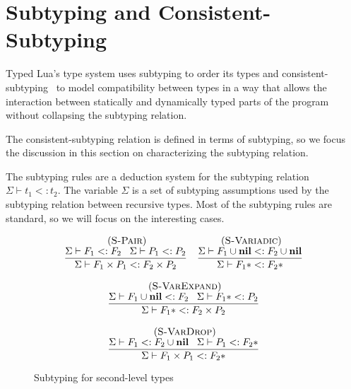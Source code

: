 \documentclass[preprint]{sigplanconf}
\newcommand{\Nil}{\mathbf{nil}}
\newcommand{\mylabel}[1]{\; (\textsc{#1})}
\newcommand{\senv}{\Sigma}
\newcommand{\subtype}{<:}
\begin{document}
\section{Subtyping and Consistent-Subtyping}
\label{sec:subtyping}

Typed Lua's type system uses subtyping to order
its types and  consistent-subtyping~\cite{siek2007objects,siek2013mutable}
to model compatibility between types in a way that allows
the interaction between statically and dynamically typed
parts of the program without collapsing the subtyping
relation.

The consistent-subtyping relation is defined in terms
of subtyping, so we focus the discussion in this section
on characterizing the subtyping relation.

The subtyping rules are a deduction system for the
subtyping relation $\senv \vdash t_{1} \subtype t_{2}$.
The variable $\senv$ is a set of subtyping assumptions used
by the subtyping relation between recursive types. 
Most of the subtyping rules are standard, so we will
focus on the interesting cases.

\begin{figure}[t]
\[
\begin{array}{c}
\begin{array}{c}
\mylabel{S-Pair}\\
\dfrac{\senv \vdash F_{1} \subtype F_{2} \;\;\;
	\senv \vdash P_{1} \subtype P_{2}}
{\senv \vdash F_{1} \times P_{1} \subtype F_{2} \times P_{2}}
\end{array}
\begin{array}{c}
\mylabel{S-Variadic}\\
\dfrac{\senv \vdash F_{1} \cup \Nil \subtype F_{2} \cup \Nil}
{\senv \vdash F_{1}{*} \subtype F_{2}{*}}
\end{array}\\\\
\begin{array}{c}
\mylabel{S-VarExpand}\\
\dfrac{\senv \vdash F_{1} \cup \Nil \subtype F_{2} \;\;\;
	\senv \vdash F_{1}{*} \subtype P_{2}}
{\senv \vdash F_{1}{*} \subtype F_{2} \times P_{2}}
\end{array}
\\ \\
\begin{array}{c}
\mylabel{S-VarDrop}\\
\dfrac{\senv \vdash F_{1} \subtype F_{2} \cup \Nil \;\;\;
	\senv \vdash P_{1} \subtype F_{2}{*}}
{\senv \vdash F_{1} \times P_{1} \subtype F_{2}{*}}
\end{array}
\end{array}
\]
\caption{Subtyping for second-level types}	
\label{fig:subtuples}
\end{figure}
\end{document}

